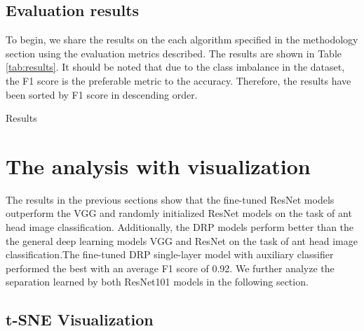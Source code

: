 \documentclass{aci}
\numberwithin{equation}{section}
\begin{document}
\subsection{Evaluation results}

To begin, we share the results on the each algorithm specified in the
methodology section using the evaluation metrics described. The results are
shown in Table \ref{tab:results}. It should be noted that due to the class
imbalance in the dataset, the F1 score is the preferable metric to the accuracy.
Therefore, the results have been sorted by F1 score in descending order.

\begin{table}[h]
    \centering
    \caption{Results}
    
    \label{tab:results}
\end{table}

\section{The analysis with visualization}

The results in the previous sections show that the fine-tuned ResNet models
outperform the VGG and randomly initialized ResNet models on the task of ant
head image classification. Additionally, the DRP models perform better than the
the general deep learning models VGG and ResNet on the task of ant head image
classification.The fine-tuned DRP single-layer model with auxiliary classifier
performed the best with an average F1 score of 0.92. We further analyze the
separation learned by both ResNet101 models in the following section.


\subsection{t-SNE Visualization}
\end{document}
